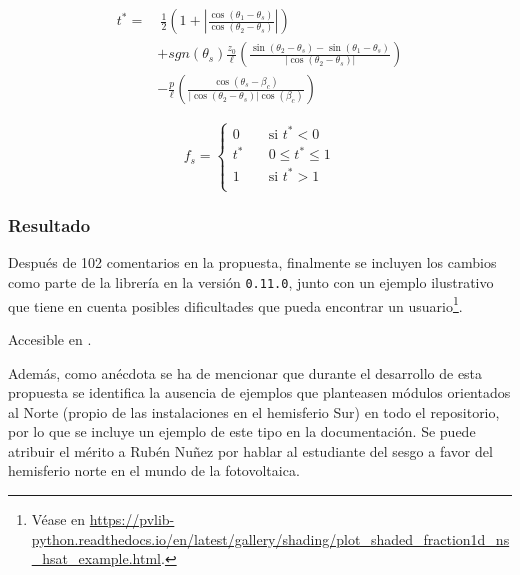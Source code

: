 \begin{equation} \label{eq:sombra_t}
    \begin{aligned}
        t^* = & \ \frac{1}{2} \left( 1 + \left|\frac{\cos(\theta_1 - \theta_s)}{\cos(\theta_2 - \theta_s)}\right| \right)                                            \\
              & + sgn(\theta_s) \frac{z_0}{\ell} \left( \frac{\sin(\theta_2 - \theta_s) - \sin(\theta_1 - \theta_s)}{\left|\cos(\theta_2 - \theta_s)\right|} \right) \\
              & - \frac{p}{\ell} \left( \frac{\cos(\theta_s - \beta_c)}{\left|\cos(\theta_2 - \theta_s)\right| \cos(\beta_c)} \right)
    \end{aligned}
\end{equation}

\begin{equation} \label{eq:sombra_clip}
    f_s =
    \begin{cases}
        0   & \quad \text{si } t^* < 0 \\
        t^* & \quad 0 \leq t^* \leq 1  \\
        1   & \quad \text{si } t^* > 1 \\
    \end{cases}
\end{equation}

\subsubsection{Resultado}

Después de 102 comentarios en la propuesta, finalmente se incluyen los cambios como parte de la librería en la versión \texttt{0.11.0}, junto con un ejemplo ilustrativo que tiene en cuenta posibles dificultades que pueda encontrar un usuario\footnote{Véase en \url{https://pvlib-python.readthedocs.io/en/latest/gallery/shading/plot_shaded_fraction1d_ns_hsat_example.html}.}.

Accesible en .

Además, como anécdota se ha de mencionar que durante el desarrollo de esta propuesta se identifica la ausencia de ejemplos que planteasen módulos orientados al Norte (propio de las instalaciones en el hemisferio Sur) en todo el repositorio, por lo que se incluye un ejemplo de este tipo en la documentación. Se puede atribuir el mérito a Rubén Nuñez por hablar al estudiante del sesgo a favor del hemisferio norte en el mundo de la fotovoltaica.

